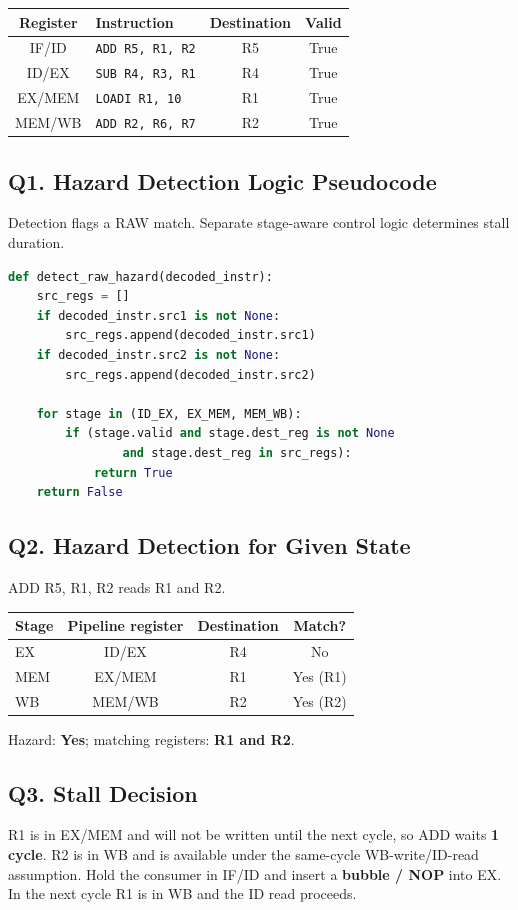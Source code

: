 \documentclass[11pt,letterpaper]{article}
\begin{document}
\begin{center}\begin{tabularx}{\linewidth}{|c|X|c|c|}\hline
\textbf{Register}&\textbf{Instruction}&\textbf{Destination}&\textbf{Valid}\\\hline
IF/ID&\texttt{ADD R5, R1, R2}&R5&True\\\hline
ID/EX&\texttt{SUB R4, R3, R1}&R4&True\\\hline
EX/MEM&\texttt{LOADI R1, 10}&R1&True\\\hline
MEM/WB&\texttt{ADD R2, R6, R7}&R2&True\\\hline
\end{tabularx}\end{center}

\subsection*{Q1. Hazard Detection Logic Pseudocode}
Detection flags a RAW match. Separate stage-aware control logic determines stall duration.
\begin{lstlisting}[language=Python,caption={RAW hazard detection pseudocode}]
def detect_raw_hazard(decoded_instr):
    src_regs = []
    if decoded_instr.src1 is not None:
        src_regs.append(decoded_instr.src1)
    if decoded_instr.src2 is not None:
        src_regs.append(decoded_instr.src2)

    for stage in (ID_EX, EX_MEM, MEM_WB):
        if (stage.valid and stage.dest_reg is not None
                and stage.dest_reg in src_regs):
            return True
    return False
\end{lstlisting}
\subsection*{Q2. Hazard Detection for Given State}
ADD R5, R1, R2 reads R1 and R2.
\begin{center}\begin{tabular}{|l|c|c|c|}\hline\textbf{Stage}&\textbf{Pipeline register}&\textbf{Destination}&\textbf{Match?}\\\hline
EX&ID/EX&R4&No\\\hline MEM&EX/MEM&R1&Yes (R1)\\\hline WB&MEM/WB&R2&Yes (R2)\\\hline\end{tabular}\end{center}
Hazard: \textbf{Yes}; matching registers: \textbf{R1 and R2}.
\subsection*{Q3. Stall Decision}
R1 is in EX/MEM and will not be written until the next cycle, so ADD waits \textbf{1 cycle}. R2 is in WB and is available under the same-cycle WB-write/ID-read assumption. Hold the consumer in IF/ID and insert a \textbf{bubble / NOP} into EX. In the next cycle R1 is in WB and the ID read proceeds.
\end{document}
